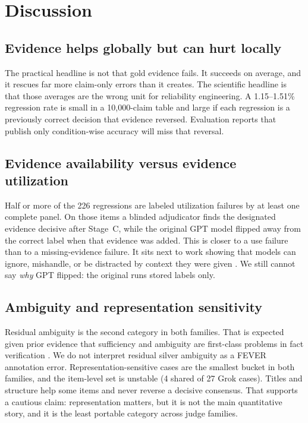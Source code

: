 \section{Discussion}
\label{sec:discussion}

\subsection{Evidence helps globally but can hurt locally}
The practical headline is not that gold evidence fails.
It succeeds on average, and it rescues far more claim-only errors than it creates.
The scientific headline is that those averages are the wrong unit for reliability engineering.
A 1.15--1.51\% regression rate is small in a 10{,}000-claim table and large if each regression is a previously correct decision that evidence reversed.
Evaluation reports that publish only condition-wise accuracy will miss that reversal.

\subsection{Evidence availability versus evidence utilization}
Half or more of the 226 regressions are labeled utilization failures by at least one complete panel.
On those items a blinded adjudicator finds the designated evidence decisive after Stage~C, while the original GPT model flipped away from the correct label when that evidence was added.
This is closer to a use failure than to a missing-evidence failure.
It sits next to work showing that models can ignore, mishandle, or be distracted by context they were given \citep{longpre-etal-2021-entity,shi2023distracted,wan-etal-2024-evidence}.
We still cannot say \emph{why} GPT flipped: the original runs stored labels only.

\subsection{Ambiguity and representation sensitivity}
Residual ambiguity is the second category in both families.
That is expected given prior evidence that sufficiency and ambiguity are first-class problems in fact verification \citep{atanasova-etal-2022-fact,glockner-etal-2024-ambifc}.
We do not interpret residual silver ambiguity as a FEVER annotation error.
Representation-sensitive cases are the smallest bucket in both families, and the item-level set is unstable (4 shared of 27 Grok cases).
Titles and structure help some items and never reverse a decisive consensus.
That supports a cautious claim: representation matters, but it is not the main quantitative story, and it is the least portable category across judge families.

